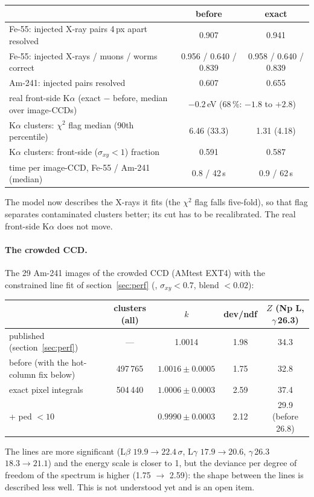 \begin{table}[H]\centering\footnotesize
\begin{tabular}{lcc}
\toprule
 & before & exact \\
\midrule
Fe-55: injected X-ray pairs 4\,px apart resolved & 0.907 & 0.941 \\
Fe-55: injected X-rays / muons / worms correct & 0.956 / 0.640 / 0.839 & 0.958 / 0.640 / 0.839 \\
Am-241: injected pairs resolved & 0.607 & 0.655 \\
real front-side K$\alpha$ (exact $-$ before, median over image-CCDs) & \multicolumn{2}{c}{$-0.2$\,eV (68\,\%: $-1.8$ to $+2.8$)} \\
K$\alpha$ clusters: $\chi^2$ flag median (90th percentile) & 6.46 (33.3) & 1.31 (4.18) \\
K$\alpha$ clusters: front-side ($\sigma_{xy}<1$) fraction & 0.591 & 0.587 \\
time per image-CCD, Fe-55 / Am-241 (median) & 0.8 / 42\,s & 0.9 / 62\,s \\
\bottomrule
\end{tabular}
\end{table}
\noindent The model now describes the X-rays it fits (the $\chi^2$ flag falls five-fold), so that flag separates
contaminated clusters better; its cut has to be recalibrated. The real front-side K$\alpha$ does not move.

\paragraph{The crowded CCD.} The 29 Am-241 images of the crowded CCD (AMtest EXT4) with the constrained line fit of
section~\ref{sec:perf} (\AGMX, $\sigma_{xy}<0.7$, blend $<0.02$):

\begin{table}[H]\centering\footnotesize
\begin{tabular}{lcccc}
\toprule
 & clusters (all) & $k$ & dev/ndf & $Z$ (Np L, $\gamma$\,26.3) \\
\midrule
published (section~\ref{sec:perf}) & --- & 1.0014 & 1.98 & 34.3 \\
before (with the hot-column fix below) & 497\,765 & $1.0016\pm0.0005$ & 1.75 & 32.8 \\
exact pixel integrals & 504\,440 & $1.0006\pm0.0003$ & 2.59 & 37.4 \\
\quad + ped $<10$ & & $0.9990\pm0.0003$ & 2.12 & 29.9 (before 26.8) \\
\bottomrule
\end{tabular}
\end{table}
\noindent The lines are more significant (L$\beta$ $19.9\to22.4\,\sigma$, L$\gamma$ $17.9\to20.6$, $\gamma$\,26.3
$18.3\to21.1$) and the energy scale is closer to 1, but the deviance per degree of freedom of the spectrum is higher
(1.75 $\to$ 2.59): the shape between the lines is described less well. This is not understood yet and is an open item.


